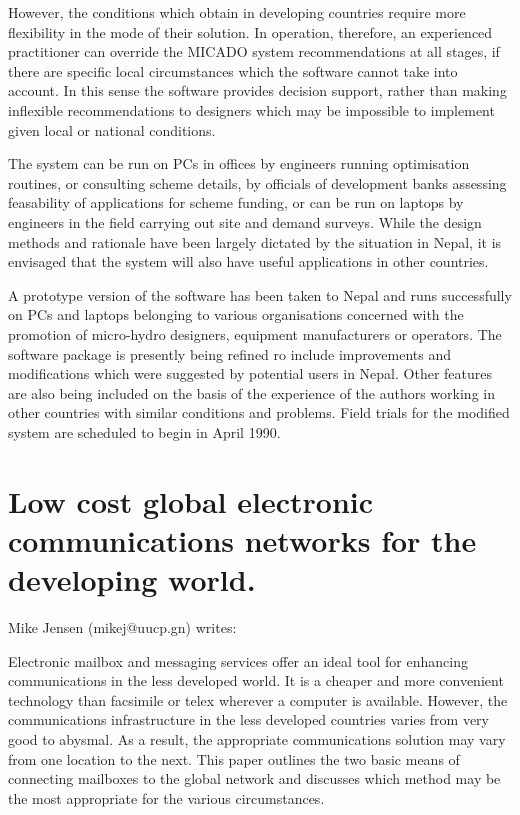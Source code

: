 However, the conditions which obtain in developing countries require
more flexibility in the mode of their solution. In operation,
therefore, an experienced practitioner can override the MICADO system
recommendations at all stages, if there are specific local
circumstances which the software cannot take into account. In this
sense the software provides decision support, rather than making
inflexible recommendations to designers which may be impossible to
implement given local or national conditions.

The system can be run on PCs in offices by engineers running
optimisation routines, or consulting scheme details, by officials of
development banks assessing feasability of applications for scheme
funding, or can be run on laptops by engineers in the field carrying
out site and demand surveys. While the design methods and rationale
have been largely dictated by the situation in Nepal, it is envisaged
that the system will also have useful applications in other countries.

A prototype version of the software has been taken to Nepal and runs
successfully on PCs and laptops belonging to various organisations
concerned with the promotion of micro-hydro designers, equipment
manufacturers or operators. The software package is presently being
refined ro include improvements and modifications which were suggested
by potential users in Nepal. Other features are also being included on
the basis of the experience of the authors working in other countries
with similar conditions and problems. Field trials for the modified
system are scheduled to begin in April 1990.

\section{Low cost global electronic communications networks for the developing world.}
Mike Jensen (mikej@uucp.gn) writes:

Electronic mailbox and messaging services offer an ideal tool for
enhancing communications in the less developed world. It is a cheaper
and more convenient technology than facsimile or telex wherever
a computer is available. However, the communications infrastructure in the
less developed countries varies from very good to abysmal. As a result, the
appropriate communications solution may vary from one location to the next.
This paper outlines the two basic means of connecting mailboxes to the
global network and discusses which method may be the most appropriate for
the various circumstances.

